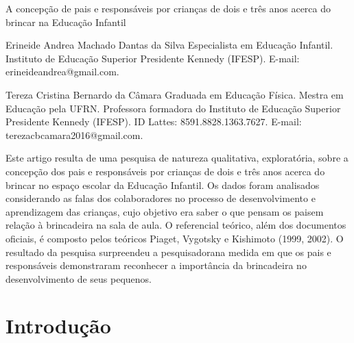 \begin{refsection}
    \renewcommand{\thefigure}{\arabic{figure}}
    
    \chapterOneLine
    {A concepção de pais e responsáveis por crianças de dois e três anos acerca do brincar na Educação Infantil}
    \label{chap:concepcao-pais-respo}

    \articleAuthor
    {Erineide Andrea Machado Dantas da Silva}
    {Especialista em Educação Infantil.  Instituto de Educação Superior Presidente Kennedy (IFESP). E-mail: erineideandrea@gmail.com.}
    
    \articleAuthor
    {Tereza Cristina Bernardo da Câmara}
    {Graduada em Educação Física. Mestra em Educação pela UFRN. Professora formadora do Instituto de Educação Superior Presidente Kennedy (IFESP). ID Lattes: 8591.8828.1363.7627. E-mail: terezacbcamara2016@gmail.com.}
    
    \begin{galoResumo}
        Este artigo resulta de uma pesquisa de natureza qualitativa, exploratória, sobre a concepção dos pais e responsáveis por crianças de dois e três anos acerca do brincar no espaço escolar da Educação Infantil. Os dados foram analisados considerando as falas dos colaboradores no processo de desenvolvimento e aprendizagem das crianças, cujo objetivo era saber o que pensam os paisem relação à brincadeira na sala de aula. O referencial teórico, além dos documentos oficiais, é composto pelos teóricos Piaget, Vygotsky e Kishimoto (1999, 2002). O resultado da pesquisa surpreendeu a pesquisadorana medida em que os pais e responsáveis demonstraram reconhecer a importância da brincadeira no desenvolvimento de seus pequenos.
    \end{galoResumo}
    


    \section{Introdução}


\end{refsection}
